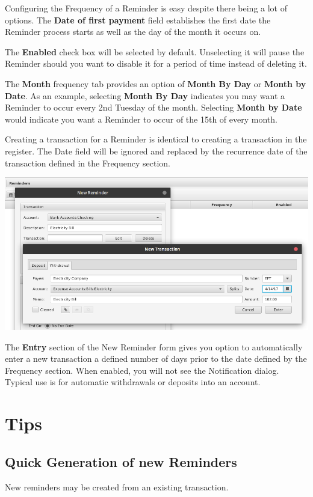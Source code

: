 \documentclass[letterpaper,12pt]{book}
\begin{document}
    Configuring the Frequency of a Reminder is easy despite there being a lot of options. The \textbf{Date of first payment}
    field establishes the first date the Reminder process starts as well as the day of the month it occurs on.

    The \textbf{Enabled} check box will be selected by default. Unselecting it will pause the Reminder should you want
    to disable it for a period of time instead of deleting it.

    The \textbf{Month} frequency tab provides an option of \textbf{Month By Day} or \textbf{Month by Date}.
    As an example, selecting \textbf{Month By Day} indicates you may want a Reminder to occur every 2nd Tuesday of the month.
    Selecting \textbf{Month by Date} would indicate you want a Reminder to occur of the 15th of every month.

    Creating a transaction for a Reminder is identical to creating a transaction in the register. The Date field will be
    ignored and replaced by the recurrence date of the transaction defined in the Frequency section.

    \includegraphics[width=0.8\linewidth]{images/remindersNewTransaction}

    The \textbf{Entry} section of the New Reminder form gives you option to automatically enter a new transaction a defined number
    of days prior to the date defined by the Frequency section. When enabled, you will not see the Notification dialog.
    Typical use is for automatic withdrawals or deposits into an account.

    \section{Tips}

    \subsection{Quick Generation of new Reminders}
    New reminders may be created from an existing transaction.
\end{document}
